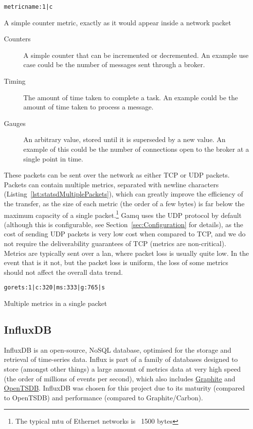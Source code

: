 \begin{listing}
  \centering
  \texttt{metricname:1|c}
  \caption{A simple counter metric, exactly as it would appear inside a network packet}
  \label{lst:statsdSchema}
\end{listing}

\begin{description}
  \item[Counters] A simple counter that can be incremented or decremented. An
  example use case could be the number of messages sent through a broker.
  \item[Timing] The amount of time taken to complete a task. An example could be
  the amount of time taken to process a message.
  \item[Gauges] An arbitrary value, stored until it is superseded by a new
  value. An example of this could be the number of connections open to the
  broker at a single point in time.
\end{description}

These packets can be sent over the network as either TCP or UDP packets. Packets
can contain multiple metrics, separated with newline characters
(Listing~\ref{lst:statsdMultiplePackets}), which can greatly improve the
efficiency of the transfer, as the size of each metric (the order of a few
bytes) is far below the maximum capacity of a single packet.\footnote{The
typical \gls{mtu} of Ethernet networks is ~1500 bytes} Gamq uses the UDP
protocol by default (although this is configurable, see
Section~\ref{sec:Configuration} for details), as the cost of sending UDP packets
is very low cost when compared to TCP, and we do not require the deliverability
guarantees of TCP (metrics are non-critical). Metrics are typically sent over a
\gls{lan}, where packet loss is usually quite low. In the event that is it not,
but the packet loss is uniform, the loss of some metrics should not affect the
overall data trend.

\begin{listing}
  \centering
  \texttt{gorets:1|c\nglork:320|ms\ngaugor:333|g\nuniques:765|s}
  \caption{Multiple metrics in a single packet}
  \label{lst:statsdMultiplePackets}
\end{listing}

\subsection{InfluxDB}
\label{sub:InfluxDB}

InfluxDB is an open-source, NoSQL database, optimised for the storage and
retrieval of \gls{time-series data}. Influx is part of a family of databases
designed to store (amongst other things) a large amount of metrics data at very
high speed (the order of millions of events per second), which also includes
\href{http://graphite.wikidot.com/}{Graphite} and
\href{http://opentsdb.net/}{OpenTSDB}. InfluxDB was chosen for this project due
to its maturity (compared to OpenTSDB) and performance (compared to
Graphite/Carbon).

